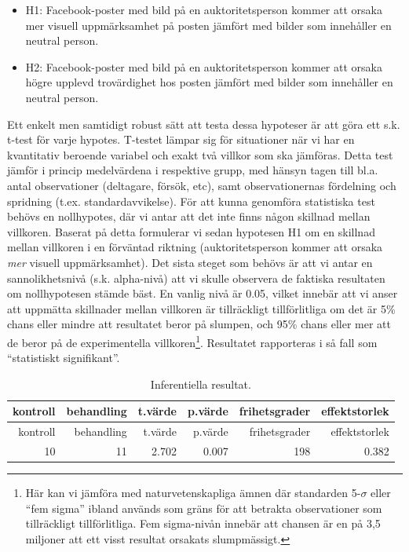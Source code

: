 \documentclass[
]{book}
\begin{document}
\begin{itemize}
\item
  H1: Facebook-poster med bild på en auktoritetsperson kommer att orsaka mer visuell uppmärksamhet på posten jämfört med bilder som innehåller en neutral person.
\item
  H2: Facebook-poster med bild på en auktoritetsperson kommer att orsaka högre upplevd trovärdighet hos posten jämfört med bilder som innehåller en neutral person.
\end{itemize}

Ett enkelt men samtidigt robust sätt att testa dessa hypoteser är att göra ett s.k. t-test för varje hypotes. T-testet lämpar sig för situationer när vi har en kvantitativ beroende variabel och exakt två villkor som ska jämföras. Detta test jämför i princip medelvärdena i respektive grupp, med hänsyn tagen till bl.a. antal observationer (deltagare, försök, etc), samt observationernas fördelning och spridning (t.ex. standardavvikelse). För att kunna genomföra statistiska test behövs en nollhypotes, där vi antar att det inte finns någon skillnad mellan villkoren. Baserat på detta formulerar vi sedan hypotesen H1 om en skillnad mellan villkoren i en förväntad riktning (auktoritetsperson kommer att orsaka \emph{mer} visuell uppmärksamhet). Det sista steget som behövs är att vi antar en sannolikhetsnivå (s.k. alpha-nivå) att vi skulle observera de faktiska resultaten om nollhypotesen stämde bäst. En vanlig nivå är 0.05, vilket innebär att vi anser att uppmätta skillnader mellan villkoren är tillräckligt tillförlitliga om det är 5\% chans eller mindre att resultatet beror på slumpen, och 95\% chans eller mer att de beror på de experimentella villkoren\footnote{Här kan vi jämföra med naturvetenskapliga ämnen där standarden 5-\(\sigma\) eller ``fem sigma'' ibland används som gräns för att betrakta observationer som tillräckligt tillförlitliga. Fem sigma-nivån innebär att chansen är en på 3,5 miljoner att ett visst resultat orsakats slumpmässigt.}. Resultatet rapporteras i så fall som ``statistiskt signifikant''.

\begin{longtable}[]{@{}rrrrrr@{}}
\caption{\label{tab:tab-02-08-1-2-01}Inferentiella resultat.}\tabularnewline
\toprule
kontroll & behandling & t.värde & p.värde & frihetsgrader & effektstorlek\tabularnewline
\midrule
\endfirsthead
\toprule
kontroll & behandling & t.värde & p.värde & frihetsgrader & effektstorlek\tabularnewline
\midrule
\endhead
10 & 11 & 2.702 & 0.007 & 198 & 0.382\tabularnewline
\bottomrule
\end{longtable}
\end{document}
